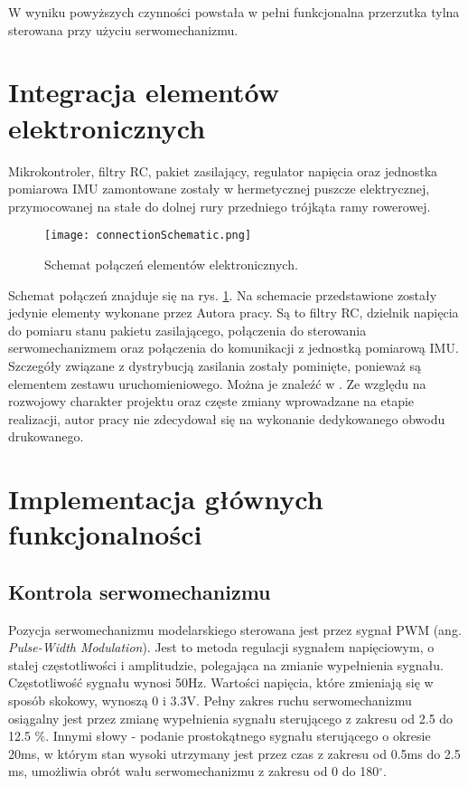 W wyniku powyższych czynności powstała w pełni funkcjonalna przerzutka tylna sterowana przy użyciu serwomechanizmu. 

\section{Integracja elementów elektronicznych}
Mikrokontroler, filtry RC, pakiet zasilający, regulator napięcia oraz jednostka pomiarowa IMU zamontowane zostały w hermetycznej puszcze elektrycznej, przymocowanej na stałe do dolnej rury przedniego trójkąta ramy rowerowej.

\begin{figure}[h]
    \centering
    \texttt{[image: connectionSchematic.png]}
    \caption{Schemat połączeń elementów elektronicznych.}
    \label{fig:schematPolaczen}
\end{figure}

Schemat połączeń znajduje się na rys. \ref{fig:schematPolaczen}. Na schemacie przedstawione zostały jedynie elementy wykonane przez Autora pracy. Są to filtry RC, dzielnik napięcia do pomiaru stanu pakietu zasilającego, połączenia do sterowania serwomechanizmem oraz połączenia do komunikacji z jednostką pomiarową IMU. Szczegóły związane z dystrybucją zasilania zostały pominięte, ponieważ są elementem zestawu uruchomieniowego. Można je znaleźć w \cite{tivaWork}. Ze względu na rozwojowy charakter projektu oraz częste zmiany wprowadzane na etapie realizacji, autor pracy nie zdecydował się na wykonanie dedykowanego obwodu drukowanego.

\section{Implementacja głównych funkcjonalności}
\subsection{Kontrola serwomechanizmu}
Pozycja serwomechanizmu modelarskiego sterowana jest przez sygnał PWM (ang. {\em Pulse-Width Modulation}). Jest to metoda regulacji sygnałem napięciowym, o stałej częstotliwości i amplitudzie, polegająca na zmianie wypełnienia sygnału. Częstotliwość sygnału wynosi 50Hz. Wartości napięcia, które zmieniają się w sposób skokowy, wynoszą 0 i 3.3V. Pełny zakres ruchu serwomechanizmu osiągalny jest przez zmianę wypełnienia sygnału sterującego z zakresu od 2.5 do 12.5 \%. Innymi słowy - podanie prostokątnego sygnału sterującego o okresie 20ms, w którym stan wysoki utrzymany jest przez czas z zakresu od 0.5ms do 2.5 ms, umożliwia obrót wału serwomechanizmu z zakresu od 0 do 180$^{\circ}$.

